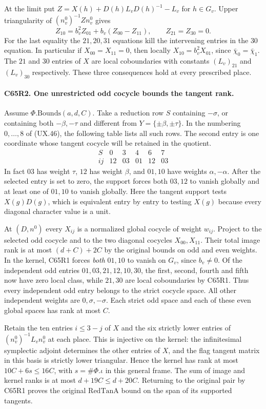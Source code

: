 At the limit put
$Z=X(h)+D(h)L_vD(h)^{-1}-L_v$ for $h\in G_v$.
Upper triangularity of $(n_v^0)^{-1}Zn_v^0$ gives
\[
 Z_{10}=b_v^2Z_{01}+b_v(Z_{00}-Z_{11}),\qquad
 Z_{21}=Z_{30}=0.
\]
For the last equality the $21,20,31$ equations kill the intervening
entries in the $30$ equation. In particular if $X_{00}=X_{11}=0$,
then locally $X_{10}=b_v^2X_{01}$, since $\bar\chi_0=\bar\chi_1$.
The $21$ and $30$ entries of $X$ are local coboundaries with constants
$(L_v)_{21}$ and $(L_v)_{30}$ respectively. These three consequences
hold at every prescribed place.

\paragraph{C65R2. One unrestricted odd cocycle bounds the tangent rank.}
Assume $\Phi.\mathrm{Bounds}(a,d,C)$. Take a reduction row $S$
containing $-\sigma$, or containing both $-\beta,-\tau$ and
different from $Y=\{\pm\beta,\pm\tau\}$. In the numbering
$0,\ldots,8$ of (UX.46), the following table lists all such rows.
The second entry is one coordinate whose tangent cocycle will be
retained in the quotient.
\[
\begin{array}{c|ccccc}
 S & 0 & 3 & 4 & 6 & 7 \\ \hline
 ij&12&03&01&12&03
\end{array}
\]
In fact $03$ has weight $\tau$, $12$ has weight $\beta$, and
$01,10$ have weights $\alpha,-\alpha$. After the selected entry is
set to zero, the support forces both $03,12$ to vanish globally and
at least one of $01,10$ to vanish globally. Here the tangent support
tests $X(g)D(g)$, which is equivalent entry by entry to testing
$X(g)$ because every diagonal character value is a unit.

At $(D,n^0)$ every $X_{ij}$ is a normalized global cocycle of
weight $w_{ij}$. Project to the selected odd cocycle and to the
two diagonal cocycles $X_{00},X_{11}$. Their total image rank is
at most $(d+C)+2C$ by the original bounds on odd and even weights.
In the kernel, C65R1 forces \emph{both} $01,10$ to vanish on $G_v$,
since $b_v\ne0$. Of the independent odd entries
$01,03,21,12,10,30$, the first, second, fourth and fifth now have
zero local class, while $21,30$ are local coboundaries by C65R1.
Thus every independent odd entry belongs to the strict cocycle space.
All other independent weights are $0,\sigma,-\sigma$. Each strict
odd space and each of these even global spaces has rank at most $C$.

Retain the ten entries $i\le 3-j$ of $X$ and the six strictly lower
entries of $(n_v^0)^{-1}L_v n_v^0$ at each place. This is injective
on the kernel: the infinitesimal symplectic adjoint determines the
other entries of $X$, and the flag tangent matrix in this basis is
strictly lower triangular. Hence the kernel has rank at most
$10C+6s\le16C$, with $s=\#\Phi.\iota$ in this general frame.
The sum of image and kernel ranks is at most $d+19C\le d+20C$.
Returning to the original pair by C65R1 proves the original
$\mathrm{RedTanA}$ bound on the span of its supported tangents.

